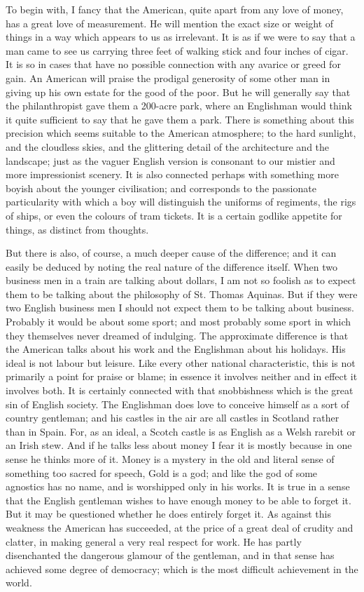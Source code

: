 \documentclass{book}
\begin{document}
To begin with, I fancy that the American, quite apart from any love of money, has a great love of measurement. He will mention the exact size or weight of things in a way which appears to us as irrelevant. It is as if we were to say that a man came to see us carrying three feet of walking stick and four inches of cigar. It is so in cases that have no possible connection with any avarice or greed for gain. An American will praise the prodigal generosity of some other man in giving up his own estate for the good of the poor. But he will generally say that the philanthropist gave them a 200-acre park, where an Englishman would think it quite sufficient to say that he gave them a park. There is something about this precision which seems suitable to the American atmosphere; to the hard sunlight, and the cloudless skies, and the glittering detail of the architecture and the landscape; just as the vaguer English version is consonant to our mistier and more impressionist scenery. It is also connected perhaps with something more boyish about the younger civilisation; and corresponds to the passionate particularity with which a boy will distinguish the uniforms of regiments, the rigs of ships, or even the colours of tram tickets. It is a certain godlike appetite for things, as distinct from thoughts.

But there is also, of course, a much deeper cause of the difference; and it can easily be deduced by noting the real nature of the difference itself. When two business men in a train are talking about dollars, I am not so foolish as to expect them to be talking about the philosophy of St. Thomas Aquinas. But if they were two English business men I should not expect them to be talking about business. Probably it would be about some sport; and most probably some sport in which they themselves never dreamed of indulging. The approximate difference is that the American talks about his work and the Englishman about his holidays. His ideal is not labour but leisure. Like every other national characteristic, this is not primarily a point for praise or blame; in essence it involves neither and in effect it involves both. It is certainly connected with that snobbishness which is the great sin of English society. The Englishman does love to conceive himself as a sort of country gentleman; and his castles in the air are all castles in Scotland rather than in Spain. For, as an ideal, a Scotch castle is as English as a Welsh rarebit or an Irish stew. And if he talks less about money I fear it is mostly because in one sense he thinks more of it. Money is a mystery in the old and literal sense of something too sacred for speech, Gold is a god; and like the god of some agnostics has no name, and is worshipped only in his works. It is true in a sense that the English gentleman wishes to have enough money to be able to forget it. But it may be questioned whether he does entirely forget it. As against this weakness the American has succeeded, at the price of a great deal of crudity and clatter, in making general a very real respect for work. He has partly disenchanted the dangerous glamour of the gentleman, and in that sense has achieved some degree of democracy; which is the most difficult achievement in the world.
\end{document}
